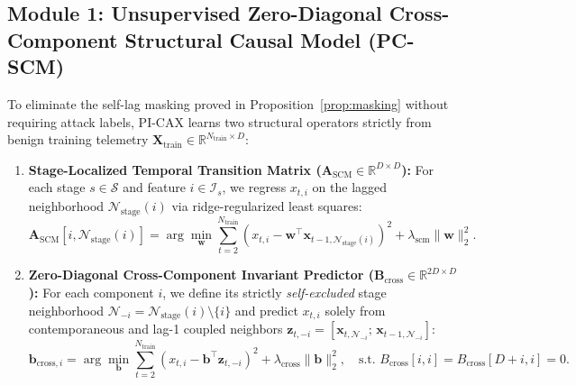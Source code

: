 \documentclass[10pt,a4paper]{article}
\begin{document}
\subsection{Module 1: Unsupervised Zero-Diagonal Cross-Component Structural Causal Model (PC-SCM)}

To eliminate the self-lag masking proved in Proposition~\ref{prop:masking} without requiring attack labels, PI-CAX learns two structural operators strictly from benign training telemetry $\mathbf{X}_{\text{train}} \in \mathbb{R}^{N_{\text{train}} \times D}$:
\begin{enumerate}\setlength{\itemsep}{2pt}\setlength{\parskip}{0pt}
    \item \textbf{Stage-Localized Temporal Transition Matrix ($\mathbf{A}_{\text{SCM}} \in \mathbb{R}^{D \times D}$):} For each stage $s \in \mathcal{S}$ and feature $i \in \mathcal{I}_s$, we regress $x_{t,i}$ on the lagged neighborhood $\mathcal{N}_{\text{stage}}(i)$ via ridge-regularized least squares:
    \begin{equation}\label{eq:a_scm}
        \mathbf{A}_{\text{SCM}}[i, \mathcal{N}_{\text{stage}}(i)] = \arg\min_{\mathbf{w}} \sum_{t=2}^{N_{\text{train}}} \left(x_{t,i} - \mathbf{w}^\top \mathbf{x}_{t-1, \mathcal{N}_{\text{stage}}(i)}\right)^2 + \lambda_{\text{scm}} \|\mathbf{w}\|_2^2.
    \end{equation}
    \item \textbf{Zero-Diagonal Cross-Component Invariant Predictor ($\mathbf{B}_{\text{cross}} \in \mathbb{R}^{2D \times D}$):} For each component $i$, we define its strictly \emph{self-excluded} stage neighborhood $\mathcal{N}_{-i} = \mathcal{N}_{\text{stage}}(i) \setminus \{i\}$ and predict $x_{t,i}$ solely from contemporaneous and lag-1 coupled neighbors $\mathbf{z}_{t,-i} = [\mathbf{x}_{t, \mathcal{N}_{-i}};\, \mathbf{x}_{t-1, \mathcal{N}_{-i}}]$:
    \begin{equation}\label{eq:b_cross}
        \mathbf{b}_{\text{cross}, i} = \arg\min_{\mathbf{b}} \sum_{t=2}^{N_{\text{train}}} \left(x_{t,i} - \mathbf{b}^\top \mathbf{z}_{t,-i}\right)^2 + \lambda_{\text{cross}} \|\mathbf{b}\|_2^2, \quad \text{s.t. } B_{\text{cross}}[i, i] = B_{\text{cross}}[D+i, i] = 0.
    \end{equation}
\end{enumerate}
\end{document}
